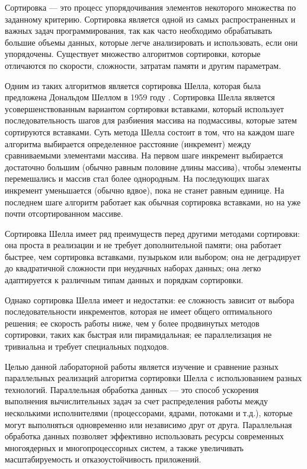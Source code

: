 \documentclass{article}
\begin{document}
Сортировка — это процесс упорядочивания элементов некоторого множества по заданному критерию. Сортировка является одной из самых распространенных и важных задач программирования, так как часто необходимо обрабатывать большие объемы данных, которые легче анализировать и использовать, если они упорядочены. Существует множество алгоритмов сортировки, которые отличаются по скорости, сложности, затратам памяти и другим параметрам.

Одним из таких алгоритмов является сортировка Шелла, которая была предложена Дональдом Шеллом в 1959 году \cite{shell}. Сортировка Шелла является усовершенствованным вариантом сортировки вставками, который использует последовательность шагов для разбиения массива на подмассивы, которые затем сортируются вставками. Суть метода Шелла состоит в том, что на каждом шаге алгоритма выбирается определенное расстояние (инкремент) между сравниваемыми элементами массива. На первом шаге инкремент выбирается достаточно большим (обычно равным половине длины массива), чтобы элементы перемешались и массив стал более однородным. На последующих шагах инкремент уменьшается (обычно вдвое), пока не станет равным единице. На последнем шаге алгоритм работает как обычная сортировка вставками, но на уже почти отсортированном массиве.

Сортировка Шелла имеет ряд преимуществ перед другими методами сортировки: она проста в реализации и не требует дополнительной памяти; она работает быстрее, чем сортировка вставками, пузырьком или выбором; она не деградирует до квадратичной сложности при неудачных наборах данных; она легко адаптируется к различным типам данных и порядкам сортировки.

Однако сортировка Шелла имеет и недостатки: ее сложность зависит от выбора последовательности инкрементов, которая не имеет общего оптимального решения; ее скорость работы ниже, чем у более продвинутых методов сортировки, таких как быстрая или пирамидальная; ее параллелизация не тривиальна и требует специальных подходов.

Целью данной лабораторной работы является изучение и сравнение разных параллельных реализаций алгоритма сортировки Шелла с использованием разных технологий. Параллельная обработка данных — это способ ускорения выполнения вычислительных задач за счет распределения работы между несколькими исполнителями (процессорами, ядрами, потоками и т.д.), которые могут выполняться одновременно или независимо друг от друга. Параллельная обработка данных позволяет эффективно использовать ресурсы современных многоядерных и многопроцессорных систем, а также увеличивать масштабируемость и отказоустойчивость приложений.
\end{document}
